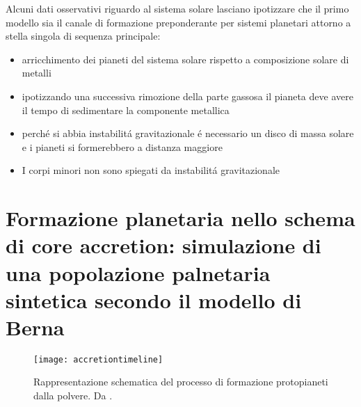 \documentclass[twoside,11pt,fleqn]{memoir}%
\begin{document}
\begin{workout}
	Alcuni dati osservativi riguardo al sistema solare lasciano ipotizzare che il primo modello sia il canale di formazione preponderante per sistemi planetari attorno a stella singola di sequenza principale:
	\begin{itemize}
		\item arricchimento dei pianeti del sistema solare rispetto a composizione solare di metalli%
		\item ipotizzando una successiva rimozione della parte gassosa il pianeta deve avere il tempo di sedimentare la componente metallica
		\item perch\'e si abbia instabilit\'a gravitazionale \'e necessario un disco di massa solare e i pianeti si formerebbero a distanza maggiore
		\item I corpi minori non sono spiegati da instabilit\'a gravitazionale
	\end{itemize}
\end{workout}


\cleartorecto

{\let\clearpage\relax\let\cleardoublepage\relax
\part{Formazione planetaria nello schema di core accretion: simulazione di una popolazione palnetaria sintetica secondo il modello di Berna }\label{part:CApps}
}
\begin{figure}[!ht]
\texttt{[image: accretiontimeline]}\caption{Rappresentazione schematica del processo di formazione protopianeti dalla polvere. Da \cite{perryman2011exoplanet}.}\label{fig:accretiontimeline}
\end{figure}
\end{document}
